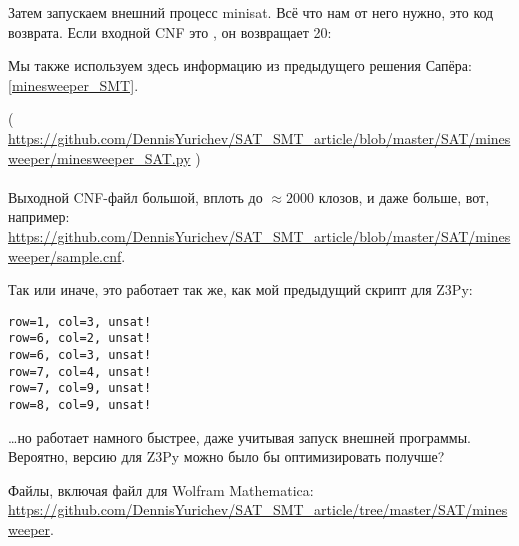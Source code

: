 Затем запускаем внешний процесс minisat.
Всё что нам от него нужно, это код возврата.
Если входной \ac{CNF} это , он возвращает 20:

Мы также используем здесь информацию из предыдущего решения Сапёра: \ref{minesweeper_SMT}.



( \url{https://github.com/DennisYurichev/SAT_SMT_article/blob/master/SAT/minesweeper/minesweeper_SAT.py} ) \\
\\
Выходной \ac{CNF}-файл большой, вплоть до $\approx 2000$ клозов, и даже больше, вот, например: \url{https://github.com/DennisYurichev/SAT_SMT_article/blob/master/SAT/minesweeper/sample.cnf}.

Так или иначе, это работает так же, как мой предыдущий скрипт для Z3Py:

\begin{lstlisting}
row=1, col=3, unsat!
row=6, col=2, unsat!
row=6, col=3, unsat!
row=7, col=4, unsat!
row=7, col=9, unsat!
row=8, col=9, unsat!
\end{lstlisting}

\dots но работает намного быстрее, даже учитывая запуск внешней программы.
Вероятно, версию для Z3Py можно было бы оптимизировать получше?

Файлы, включая файл для Wolfram Mathematica: \url{https://github.com/DennisYurichev/SAT_SMT_article/tree/master/SAT/minesweeper}.

